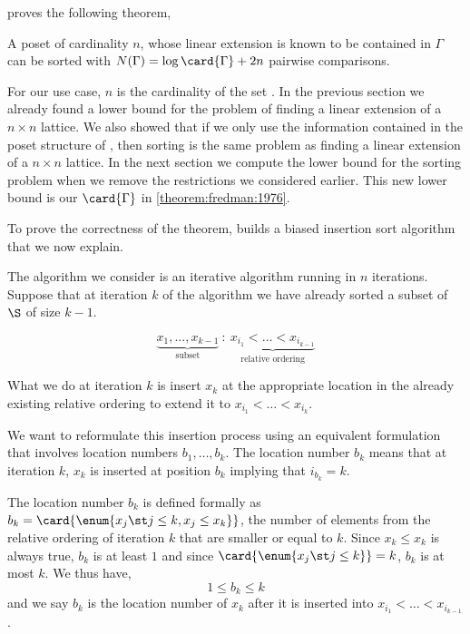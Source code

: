 \citet{fredman:1976} proves the following theorem,
\begin{theorem}\label{theorem:fredman:1976}
A poset of cardinality $n$, whose linear extension is known to be contained in
$\Gamma$ can be sorted with $N(\Gamma) = \log \card{\Gamma} + 2n$ pairwise
comparisons.
\end{theorem}
For our use case, \(n\) is the cardinality of the set
\XY. In the previous section we already found a lower bound for the problem of
finding a linear extension of a \(n \times n\) lattice. We also showed that if
we only use the information contained in the poset structure of \XY, then
sorting \XY is the same problem as finding a linear extension of a \(n \times
n\) lattice. In the next section we compute the lower bound for the
sorting \XY problem when we remove the restrictions we considered earlier. This
new lower bound is our $\card{\Gamma}$ in \ref{theorem:fredman:1976}.

To prove the correctness of the theorem, \citet{fredman:1976} builds a biased
insertion sort algorithm that we now explain.

The algorithm we consider is an iterative algorithm running in \(n\)
iterations. Suppose that at iteration \(k\) of the algorithm we have already sorted a
subset of \(\S\) of size \(k-1\).

\begin{displaymath}
\underbrace{x_1, \ldots, x_{k-1}}_{\text{subset}}~:~\underbrace{x_{i_1} <
\ldots < x_{i_{k-1}}}_{\text{relative ordering}}
\end{displaymath}

What we do at iteration $k$ is insert $x_k$ at the appropriate location
in the already existing relative ordering to extend it to $x_{i_1} < \ldots <
x_{i_k}$.

We want to reformulate this insertion process using an equivalent formulation
that involves location numbers $b_1, \ldots, b_k$. The location
number $b_k$ means that at iteration $k$, $x_k$ is inserted at position
$b_k$ implying that $i_{b_k} = k$.

The location number $b_k$ is defined formally as $b_k = \card{\enum{x_j \st j
\le k, x_j \le x_k}}$, \ie the number of elements from the relative ordering
of iteration $k$ that are smaller or equal to $k$. Since $x_k \le x_k$ is
always true, $b_k$ is at least $1$ and since $\card{\enum{x_j \st j \le k}} =
k$, $b_k$ is at most $k$. We thus have,
$$ 1 \le b_k \le k$$
and we say $b_k$ is the location number of $x_k$ after it is inserted into
$x_{i_1} < \ldots < x_{i_{k-1}}$.

